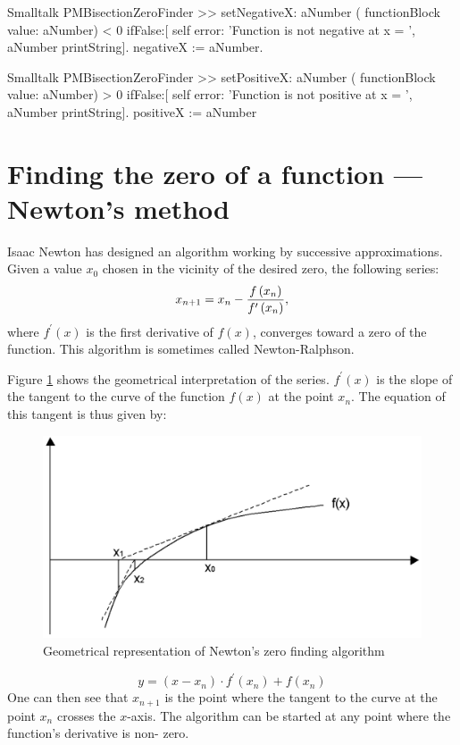 \begin{displaycode}{Smalltalk}
PMBisectionZeroFinder >> setNegativeX: aNumber
    ( functionBlock value: aNumber) < 0
        ifFalse:[ self error: 'Function is not negative at x = ', 
                                                 aNumber printString].
    negativeX := aNumber.
\end{displaycode}

\begin{displaycode}{Smalltalk}
PMBisectionZeroFinder >> setPositiveX: aNumber
    ( functionBlock value: aNumber) > 0
        ifFalse:[ self error: 'Function is not positive at x = ', 
                                                 aNumber printString].
    positiveX := aNumber
\end{displaycode}

\section{Finding the zero of a function --- Newton's method}
\label{sec:newton}
Isaac Newton has designed an algorithm working by successive approximations\cite{Bass}.
Given a value $x_0$ chosen in the vicinity of the desired zero, the following series:
\begin{equation}
\label{eq:newtonZero}
  x_{n+1}=x_n-{f\left(x_n\right)\over f^{\prime}\left(x_n\right)},
\end{equation}
where $f^{\prime}\left(x\right)$ is the first derivative of $f\left(x\right)$, converges toward a zero of the function.
This algorithm is sometimes called Newton-Ralphson\cite{Press}.

Figure \ref{fig:newtonZero} shows the geometrical interpretation
of the series. $f^{\prime}\left(x\right)$ is the slope of the
tangent to the curve of the function $f\left(x\right)$ at the
point $x_n$. The equation of this tangent is thus given by:
\begin{figure}
\centering\includegraphics[width=12cm]{Figures/NewtonGraph}
\caption{Geometrical representation of Newton's zero finding
algorithm}\label{fig:newtonZero}
\end{figure}
\begin{equation}
  y=\left(x-x_n\right)\cdot f^{\prime}\left(x_n\right)+f\left(x_n\right)
\end{equation}
One can then see that $x_{n+1}$ is the point where the tangent to
the curve at the point $x_n$ crosses the $x$-axis. The algorithm
can be started at any point where the function's derivative is
non- zero.

